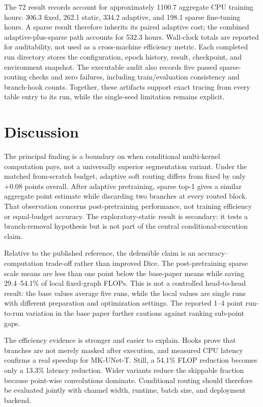 \documentclass[conference]{IEEEtran}
\begin{document}
The 72 result records account for approximately 1100.7 aggregate CPU training hours: 306.3 fixed, 262.1 static, 334.2 adaptive, and 198.1 sparse fine-tuning hours. A sparse result therefore inherits its paired adaptive cost; the combined adaptive-plus-sparse path accounts for 532.3 hours. Wall-clock totals are reported for auditability, not used as a cross-machine efficiency metric. Each completed run directory stores the configuration, epoch history, result, checkpoint, and environment snapshot. The executable audit also records five passed sparse-routing checks and zero failures, including train/evaluation consistency and branch-hook counts. Together, these artifacts support exact tracing from every table entry to its run, while the single-seed limitation remains explicit.

\section{Discussion}
The principal finding is a boundary on when conditional multi-kernel computation pays, not a universally superior segmentation variant. Under the matched from-scratch budget, adaptive soft routing differs from fixed by only $+0.08$ points overall. After adaptive pretraining, sparse top-1 gives a similar aggregate point estimate while discarding two branches at every routed block. That observation concerns post-pretraining performance, not training efficiency or equal-budget accuracy. The exploratory-static result is secondary: it tests a branch-removal hypothesis but is not part of the central conditional-execution claim.

Relative to the published reference, the defensible claim is an accuracy--computation trade-off rather than improved Dice. The post-pretraining sparse scale means are less than one point below the base-paper means while saving 29.4--54.1\% of local fixed-graph FLOPs. This is not a controlled head-to-head result: the base values average five runs, while the local values are single runs with different preparation and optimization settings. The reported 1--4 point run-to-run variation in the base paper further cautions against ranking sub-point gaps.

The efficiency evidence is stronger and easier to explain. Hooks prove that branches are not merely masked after execution, and measured CPU latency confirms a real speedup for MK-UNet-T. Still, a 54.1\% FLOP reduction becomes only a 13.3\% latency reduction. Wider variants reduce the skippable fraction because point-wise convolutions dominate. Conditional routing should therefore be evaluated jointly with channel width, runtime, batch size, and deployment backend.
\end{document}
